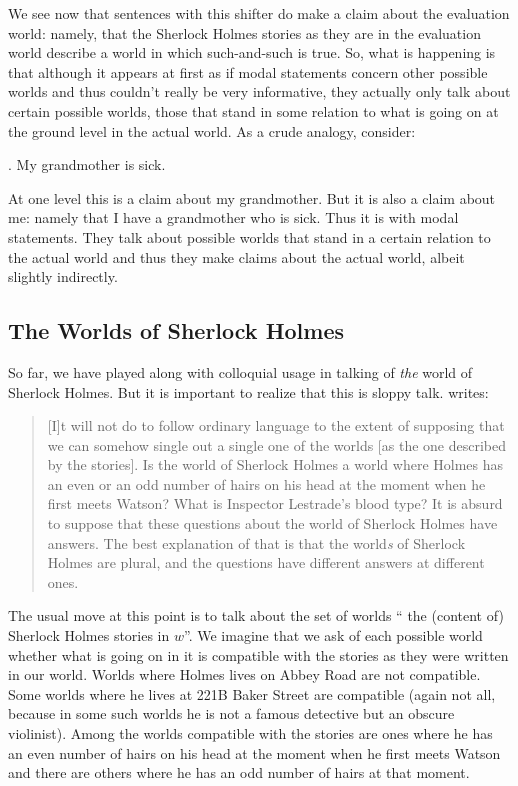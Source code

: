 We see now that sentences with this shifter do make a claim about the
evaluation world: namely, that the Sherlock Holmes stories as they are
in the evaluation world describe a world in which such-and-such is
true. So, what is happening is that although it appears at first as if
modal statements concern other possible worlds and thus couldn't
really be very informative, they actually only talk about certain
possible worlds, those that stand in some relation to what is going on
at the ground level in the actual world. As a crude analogy, consider:

\ex. My grandmother is sick.

At one level this is a claim about my grandmother. But it is also a
claim about me: namely that I have a grandmother who is sick. Thus it
is with modal statements. They talk about possible worlds that stand
in a certain relation to the actual world and thus they make claims
about the actual world, albeit slightly indirectly.

\subsection{The Worlds of Sherlock Holmes} \label{sec:worlds-sherl-holm}

So far, we have played along with colloquial usage in talking of
\emph{the} world of Sherlock Holmes. But it is important to realize
that this is sloppy talk. \citet{lewis:1978:fiction} writes:

\begin{quote}
  [I]t will not do to follow ordinary language to the extent of
  supposing that we can somehow single out a single one of the worlds
  [as the one described by the stories]. Is the world of Sherlock
  Holmes a world where Holmes has an even or an odd number of hairs on
  his head at the moment when he first meets Watson? What is Inspector
  Lestrade's blood type? It is absurd to suppose that these questions
  about the world of Sherlock Holmes have answers. The best
  explanation of that is that the world\emph{s} of Sherlock Holmes are
  plural, and the questions have different answers at different ones.
\end{quote}
%
The usual move at this point is to talk about the set of worlds
`` the (content of) Sherlock Holmes stories in
$w$''. We imagine that we ask of each possible world whether what is
going on in it is compatible with the stories as they were written in
our world. Worlds where Holmes lives on Abbey Road are not compatible.
Some worlds where he lives at 221B Baker Street are compatible (again
not all, because in some such worlds he is not a famous detective but
an obscure violinist). Among the worlds compatible with the stories
are ones where he has an even number of hairs on his head at the
moment when he first meets Watson and there are others where he has an
odd number of hairs at that moment.

